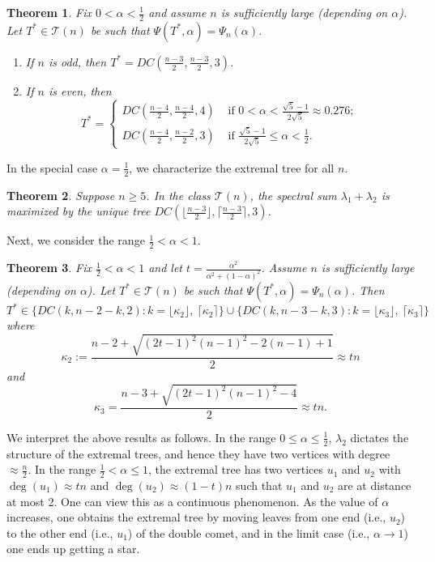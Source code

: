 \documentclass[11pt]{article}
\theoremstyle{plain}
\newtheorem{theorem}{Theorem}[section]
\numberwithin{equation}{section}
\begin{document}
\begin{theorem}\label{thm:alpha_less_than_half}
Fix $0 < \alpha < \frac{1}{2}$ and assume $n$ is sufficiently large (depending on $\alpha$). Let $T^*\in \mathcal{T}(n)$ be such that $\Psi(T^*,\alpha)=\Psi_n(\alpha)$. 
\begin{enumerate}[$(i)$]
    \item If $n$ is odd, then $T^* = DC(\frac{n-3}{2},\frac{n-3}{2}, 3)$.
    \item If $n$ is even, then
    \[T^* =  
    \begin{cases}
        DC(\frac{n-4}{2}, \frac{n-4}{2}, 4) & \text{ if } 0<\alpha < \frac{\sqrt{5}-1}{2\sqrt{5}} \approx 0.276; \\[4pt]
        DC(\frac{n-4}{2}, \frac{n-2}{2}, 3) & \text{ if } \frac{\sqrt{5}-1}{2\sqrt{5}} \le \alpha < \frac{1}{2}. 
    \end{cases}
    \]
\end{enumerate}
\end{theorem}

In the special case $\alpha = \frac{1}{2}$, we characterize the extremal tree for all $n$.

\begin{theorem}\label{thm:tree_max_spectral_sum} Suppose $n\ge 5$.
In the class $\mathcal{T}(n)$, the spectral sum $\lambda_1+\lambda_2$ is maximized by the unique tree $DC(\lfloor\frac{n-3}{2}\rfloor,\lceil\frac{n-3}{2}\rceil, 3)$. 
\end{theorem}

Next, we consider the range $\frac{1}{2}<\alpha < 1$. 

\begin{theorem}\label{thm:alpha_more_than_half}
Fix $\frac{1}{2}<\alpha <1$ and let $ t=\frac{\alpha^2}{\alpha^2 + (1-\alpha)^2}$. Assume $n$ is sufficiently large (depending on $\alpha$). Let $T^*\in \mathcal{T}(n)$ be such that $\Psi(T^*,\alpha)=\Psi_n(\alpha)$. Then 
  \[ T^*\in \{DC(k, n-2-k, 2): k = \lfloor\kappa_2\rfloor, \ \lceil \kappa_2\rceil \}\cup \{DC(k, n-3-k, 3): k = \lfloor\kappa_3\rfloor, \ \lceil \kappa_3\rceil \}\]
where 
\[ \kappa_2 := \frac{n-2+\sqrt{(2t-1)^2(n-1)^2-2(n-1)+1}}{2}\approx tn\]
and 
\[ \kappa_3 = \frac{n-3+\sqrt{(2t-1)^2(n-1)^2-4}}{2}\approx tn.\]
\end{theorem}

We interpret the above results as follows. In the range $0\le \alpha \le \frac{1}{2}$, $\lambda_2$ dictates the structure of the extremal trees, and hence they have two vertices with degree $\approx \frac{n}{2}$. In the range $\frac{1}{2}<\alpha\le 1$, the extremal tree has two vertices $u_1$ and $u_2$ with $\deg(u_1)\approx tn$ and $\deg(u_2)\approx (1-t)n$ such that $u_1$ and $u_2$ are at distance at most 2. One can view this as a continuous phenomenon. As the value of $\alpha$ increases, one obtains the extremal tree by moving leaves from one end (i.e., $u_2$) to the other end (i.e., $u_1$) of the double comet, and in the limit case (i.e., $\alpha \rightarrow 1$) one ends up getting a star. 
\end{document}
